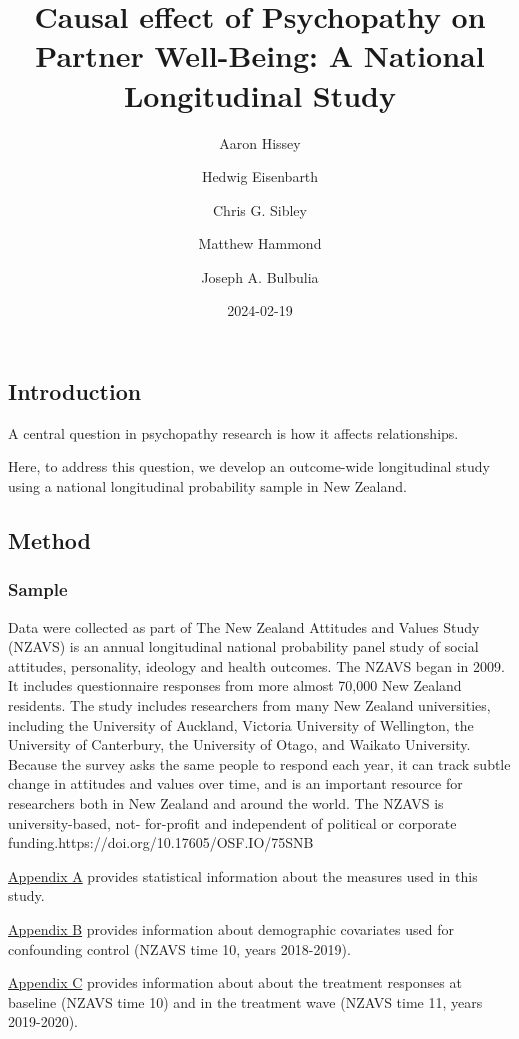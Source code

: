 \documentclass[
  singlecolumn]{article}
\title{Causal effect of Psychopathy on Partner Well-Being: A National
Longitudinal Study}
\author{Aaron Hissey \and Hedwig Eisenbarth \and Chris G.
Sibley \and Matthew Hammond \and Joseph A. Bulbulia}
\date{2024-02-19}
\begin{document}
\maketitle

\subsection{Introduction}\label{introduction}

A central question in psychopathy research is how it affects
relationships.

Here, to address this question, we develop an outcome-wide longitudinal
study using a national longitudinal probability sample in New Zealand.

\subsection{Method}\label{method}

\subsubsection{Sample}\label{sample}

Data were collected as part of The New Zealand Attitudes and Values
Study (NZAVS) is an annual longitudinal national probability panel study
of social attitudes, personality, ideology and health outcomes. The
NZAVS began in 2009. It includes questionnaire responses from more
almost 70,000 New Zealand residents. The study includes researchers from
many New Zealand universities, including the University of Auckland,
Victoria University of Wellington, the University of Canterbury, the
University of Otago, and Waikato University. Because the survey asks the
same people to respond each year, it can track subtle change in
attitudes and values over time, and is an important resource for
researchers both in New Zealand and around the world. The NZAVS is
university-based, not- for-profit and independent of political or
corporate funding.https://doi.org/10.17605/OSF.IO/75SNB

\hyperref[appendix-measures]{Appendix A} provides statistical
information about the measures used in this study.

\hyperref[appendix-demographics]{Appendix B} provides information about
demographic covariates used for confounding control (NZAVS time 10,
years 2018-2019).

\hyperref[appendix-exposures]{Appendix C} provides information about
about the treatment responses at baseline (NZAVS time 10) and in the
treatment wave (NZAVS time 11, years 2019-2020).
\end{document}
